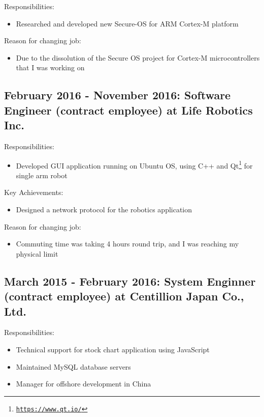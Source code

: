 \documentclass[letterpaper]{article}
\begin{document}
\noindent Responsibilities:

\begin{itemize}
  \item Researched and developed new Secure-OS for ARM Cortex-M platform
\end{itemize}

\noindent Reason for changing job:

\begin{itemize}
  \item Due to the dissolution of the Secure OS project for Cortex-M microcontrollers that I was working on
\end{itemize}

\subsection*{February 2016 - November 2016: Software Engineer (contract employee) at Life Robotics Inc.}

\noindent Responsibilities:

\begin{itemize}
  \item Developed GUI application running on Ubuntu OS, using C++ and Qt\footnote{\href{https://www.qt.io/}{\tt https://www.qt.io/}} for single arm robot
\end{itemize}

\noindent Key Achievements:

\begin{itemize}
  \item Designed a network protocol for the robotics application
\end{itemize}

\noindent Reason for changing job:

\begin{itemize}
  \item Commuting time was taking 4 hours round trip, and I was reaching my physical limit
\end{itemize}

\subsection*{March 2015 - February 2016: System Enginner (contract employee) at Centillion Japan Co., Ltd.}

\noindent Responsibilities:

\begin{itemize}
  \item Technical support for stock chart application using JavaScript
  \item Maintained MySQL database servers
  \item Manager for offshore development in China
\end{itemize}
\end{document}
